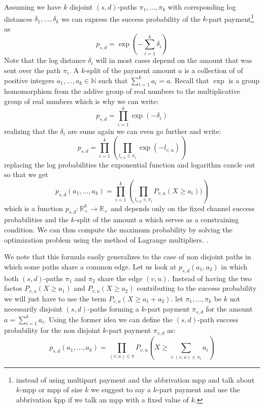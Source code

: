 \documentclass[10pt,twocolumn]{article}
\begin{document}
Assuming we have $k$ disjoint $(s,d)$-paths $\pi_1,\dots,\pi_k$ with corrsponding log distances $\delta_1,\dots,\delta_k$ we can express the success probability of the $k$-part payment\footnote{instead of using multipart payment and the abbrivation mpp and talk about $k$-mpp or mpp of size $k$ we suggest to say a $k$-part payment and use the abbrivation kpp if we talk an mpp with a fixed value of $k$.} as
\[
p_{s,d} = \exp\left(-\sum_{i=1}^k\delta_i\right)
\]
Note that the log distance $\delta_i$ will in most cases depend on the amount that was sent over the path $\pi_i$.
A $k$-split of the payment amount $a$ is a collection of of positive integers $a_1,\dots,a_k \in \mathbb{N}$ such that $\sum_{i=1}^ka_i=a$.
Recall that $\exp$ is a group homomorphism from the addive group of real numbers to the multiplicative group of real numbers which is why we can write: 
\[
p_{s,d} = \prod_{i=1}^k\exp(-\delta_i)
\]
realizing that the $\delta_i$ are sums again we can even go further and write:
\[
p_{s,d} = \prod_{i=1}^k\left(\prod_{l_{v,u}\in\pi_i}\exp(-l_{v,u})\right)
\]
replacing the log probabilities the exponential function and logarithm cancle out so that we get
\[
p_{s,d}(a_1,\dots,a_k) = \prod_{i=1}^k\left(\prod_{l_{v,u}\in\pi_i}P_{v,u}(X\geq a_i))\right)
\]
which is a function $p_{s,d}:\mathbb{R}^k_+\longrightarrow\mathbb{R}_+$ and depends only on the fixed channel success probabilities and the $k$-split of the amount $a$ which serves as a constraining condition.
We can thus compute the maximum probability by solving the optimization problem using the method of Lagrange multipliers.
.

We note that this formula easily generalizes to the case of non disjoint paths in which some paths share a common edge.
Let us look at $p_{s,d}(a_1,a_2)$ in which both $(s,d)$-paths $\pi_1$ and $\pi_2$ share the edge $(v,u)$.
Instead of having the two factos $P_{v,u}(X\geq a_1)$ and $P_{v,u}(X\geq a_2)$ contributing to the success probability we will just have to use the term $P_{v,u}(X\geq a_1 + a_2)$.
let $\pi_1,\dots,\pi_k$ be $k$ not necessarily disjoint $(s,d)$-paths forming a $k$-part payment $\pi_{s,d}$ for the amount $a=\sum_{i=1}^ka_i$.
Using the former idea we can define the $(s,d)$-path success probability for the non disjoint $k$-part payment $\pi_{s,d}$ as:
\[
p_{s,d}(a_1,\dots,a_k)=\prod_{(v,u)\in \pi}P_{v,u}\left(X \geq \sum_{i:(v,u)\in \pi_i} a_i\right)
\]

\end{document}
